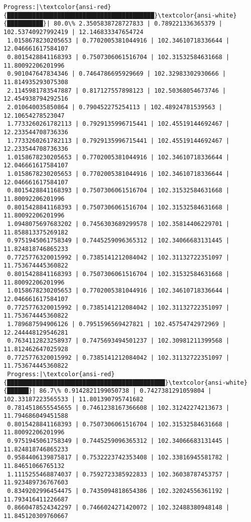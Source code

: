\documentclass[11pt]{article}
\begin{document}
\begin{Verbatim}[commandchars=\\\{\}]
 Progress:|\textcolor{ansi-red}{█████████████████████████████████████████}\textcolor{ansi-white}{██████████}| 80.0\% 2.3505838728727833 | 0.789221336365379 | 102.53740927992419 | 12.146833347654724
 1.0158678230205653 | 0.7702005381044916 | 102.34610718336644 | 12.046661617584107
 0.8015428841168393 | 0.7507306061516704 | 102.31532584631668 | 11.80092206201996
 0.901047647834346 | 0.7464786695929669 | 102.32983302930666 | 11.814935293075308
 2.1145981783547887 | 0.817127557898123 | 102.50368054673746 | 12.454938794292516
 2.010640035850864 | 0.790452275254113 | 102.48924781539563 | 12.10654278523047
 1.7733260261782113 | 0.7929135996715441 | 102.45519144692467 | 12.233544708736336
 1.7733260261782113 | 0.7929135996715441 | 102.45519144692467 | 12.233544708736336
 1.0158678230205653 | 0.7702005381044916 | 102.34610718336644 | 12.046661617584107
 1.0158678230205653 | 0.7702005381044916 | 102.34610718336644 | 12.046661617584107
 0.8015428841168393 | 0.7507306061516704 | 102.31532584631668 | 11.80092206201996
 0.8015428841168393 | 0.7507306061516704 | 102.31532584631668 | 11.80092206201996
 1.0948075697683202 | 0.7456303689299578 | 102.35814406229701 | 11.858813375269182
 0.9751945061758349 | 0.7445259096365312 | 102.34066683131445 | 11.824818746865233
 0.7725776320015992 | 0.7385141212084042 | 102.31132722351097 | 11.753674445360822
 0.8015428841168393 | 0.7507306061516704 | 102.31532584631668 | 11.80092206201996
 1.0158678230205653 | 0.7702005381044916 | 102.34610718336644 | 12.046661617584107
 0.7725776320015992 | 0.7385141212084042 | 102.31132722351097 | 11.753674445360822
 1.789687594906126 | 0.7951596569427821 | 102.45754742972969 | 12.244448129546281
 0.7634112823258937 | 0.7475693494501237 | 102.30981211399568 | 11.812462647025928
 0.7725776320015992 | 0.7385141212084042 | 102.31132722351097 | 11.753674445360822
 Progress:|\textcolor{ansi-red}{████████████████████████████████████████████}\textcolor{ansi-white}{██████}| 86.7\% 0.9142821199050738 | 0.7427381291059804 | 102.33187223565533 | 11.801390795741682
 0.7814518655545655 | 0.7461238167366608 | 102.31242274213673 | 11.794686049451588
 0.8015428841168393 | 0.7507306061516704 | 102.31532584631668 | 11.80092206201996
 0.9751945061758349 | 0.7445259096365312 | 102.34066683131445 | 11.824818746865233
 0.9584406139875817 | 0.7532223742353408 | 102.33816945581782 | 11.84651066765132
 1.1115255468874037 | 0.7592723385922833 | 102.36038787453757 | 11.923489736767603
 0.8349202996454475 | 0.7435094818654386 | 102.32024556361192 | 11.793416411226687
 0.8660478524342297 | 0.7466024271420072 | 102.32488380948148 | 11.845120309760667

\end{Verbatim}
\end{document}
